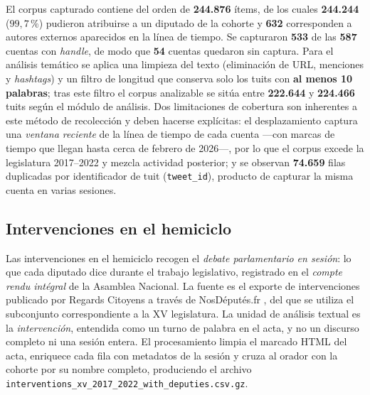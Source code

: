 El corpus capturado contiene del orden de \textbf{244.876} ítems, de los cuales
\textbf{244.244} ($99{,}7\,\%$) pudieron atribuirse a un diputado de la cohorte y
\textbf{632} corresponden a autores externos aparecidos en la línea de tiempo.
Se capturaron \textbf{533} de las \textbf{587} cuentas con \emph{handle}, de modo
que \textbf{54} cuentas quedaron sin captura. Para el análisis temático se aplica
una limpieza del texto (eliminación de URL, menciones y \emph{hashtags}) y un
filtro de longitud que conserva solo los tuits con \textbf{al menos 10
palabras}; tras este filtro el corpus analizable se sitúa entre
\textbf{222.644} y \textbf{224.466} tuits según el módulo de análisis. Dos
limitaciones de cobertura son inherentes a este método de
recolección y deben hacerse explícitas: el desplazamiento captura una
\emph{ventana reciente} de la línea de tiempo de cada cuenta ---con marcas de
tiempo que llegan hasta cerca de febrero de 2026---, por lo que el corpus excede
la legislatura 2017--2022 y mezcla actividad posterior; y se observan
\textbf{74.659} filas duplicadas por identificador de tuit (\texttt{tweet\_id}),
producto de capturar la misma cuenta en varias sesiones.

\subsection{Intervenciones en el hemiciclo}
\label{sec:corpus-hemiciclo}

Las intervenciones en el hemiciclo recogen el \emph{debate parlamentario en
sesión}: lo que cada diputado dice durante el trabajo legislativo, registrado en
el \emph{compte rendu intégral} de la Asamblea Nacional. La fuente es el exporte
de intervenciones publicado por Regards Citoyens a través de NosDéputés.fr
\cite{regardscitoyens_nosdeputes}, del que se utiliza el subconjunto
correspondiente a la XV legislatura. La unidad de análisis textual es la
\emph{intervención}, entendida como un turno de palabra en el acta, y no un
discurso completo ni una sesión entera. El procesamiento limpia el marcado HTML
del acta, enriquece cada fila con metadatos de la sesión y cruza al orador con la
cohorte por su nombre completo, produciendo el archivo
\texttt{interventions\_xv\_2017\_2022\_with\_deputies.csv.gz}.


